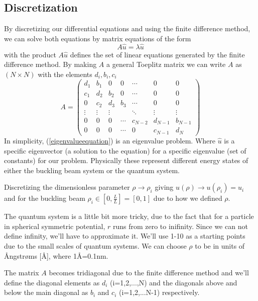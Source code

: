 \documentclass[aip,nobalancelastpage,
twocolumn,
rsi,%
 amsmath,amssymb,
 reprint,%
]{revtex4}
\begin{document}
\subsection{Discretization}
By discretizing our differential equations and using the finite difference method, we can solve both equations by matrix equations of the form
\begin{equation}
\label{eigenvalueequation}
A\hat{u} = \lambda \hat{u}
\end{equation}
with the product $A\hat{u}$ defines the set of linear equations generated by the finite difference method. By making $A$ a general Toeplitz matrix we can write $A$ as $(N\times N)$ with the elements $d_i,b_i,c_i$
\begin{equation}
A = \begin{pmatrix}
d_1 & b_1 & 0   & 0 &   \cdots & 0 & 0 \\ 
c_1 & d_2 & b_2 & 0 & \cdots & 0 & 0 \\
0   & c_2 & d_3 & b_3 & \cdots & 0 & 0\\
  \vdots  &  \vdots   & \vdots &  &    \ddots    & \vdots & \vdots\\
0 & 0 & 0 & \cdots & c_{N-2} & d_{N-1} & b_{N-1} \\
0 & 0 & 0 & \cdots  & 0 & c_{N-1} & d_N  
\end{pmatrix}
\end{equation}
In simplicity, (\ref{eigenvalueequation}) is an eigenvalue problem. Where $\hat{u}$ is a specific eigenvector (a solution to the equation) for a specific eigenvalue (set of constants) for our problem. Physically these represent different energy states of either the buckling beam system or the quantum system.\par
Discretizing the dimensionless parameter $\rho \rightarrow \rho_i$ giving $u(\rho)\rightarrow u(\rho_i)=u_i$ and for the buckling beam $\rho_i \in [0, \frac{L}{L}]=[0,1]$ due to how we defined $\rho$.\par
The quantum system is a little bit more tricky, due to the fact that for a particle in spherical symmetric potential, $r$ runs from zero to inifinity. Since we can not define infinity, we'll have to approximate it. We'll use 1-10 as a starting points due to the small scales of quantum systems. We can choose $\rho$ to be in units of Ångstrøms [Å], where 1Å=0.1nm.\par
The matrix $A$ becomes tridiagonal due to the finite difference method and we'll define the diagonal elements as $d_i$ (i=1,2,...,N) and the diagonals above and below the main diagonal as $b_i$ and $c_i$ (i=1,2,...N-1) respectively.\par
\end{document}
